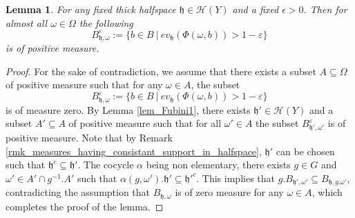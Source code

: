 \documentclass{amsart}
\numberwithin{equation}{section}
\newtheorem{lem}[thm]{Lemma}
\newcommand{\HH}{\mathcal{H}}     %
\newcommand{\hh}{\mathfrak{h}}    %
\theoremstyle{definition}
\begin{document}
\begin{lem}\label{lem_Fubini2}
    For any fixed thick halfspace $\hh\in \HH(Y)$ and a fixed $\epsilon>0$. Then for almost all $\omega \in\Omega$ the following 
    \[
    B_{\hh,\omega}^\varepsilon:=\{b\in B\ | \ ev_\hh(\Phi(\omega,b))>1-\varepsilon\}
    \]
    is of positive measure.
\end{lem}
\begin{proof}
    For the sake of contradiction, we assume that there exists a subset $A\subseteq \Omega$ of positive measure such that for any $\omega \in A$, the subset 
    \[
     B_{\hh,\omega}^\varepsilon:=\{b\in B\ | \ ev_\hh(\Phi(\omega,b))>1-\varepsilon\}
    \]
    is of measure zero. By Lemma \ref{lem_Fubini1}, there exists $\hh'\in\HH(Y)$ and a subset $A'\subseteq A$ of positive measure such that for all $\omega'\in A$ the subset $B_{\hh',\omega'}^\varepsilon$ is of positive measure. Note that by Remark \ref{rmk_measures_having_consistant_support_in_halfspace}, $\hh'$ can be chosen such that $\hh^c\subseteq \hh'$. The cocycle $\alpha$ being non elementary, there exists $g\in G$ and $\omega'\in A'\cap g^{-1}.A'$ such that $\alpha(g,\omega').\hh'\subseteq \hh'^c$. This implies that $g.B_{\hh',\omega'}\subseteq B_{\hh,g.\omega'}$, contradicting the assumption that $B_{\hh,\omega}$ is of zero measure for any $\omega\in A$, which completes the proof of the lemma.  
\end{proof}
\end{document}
